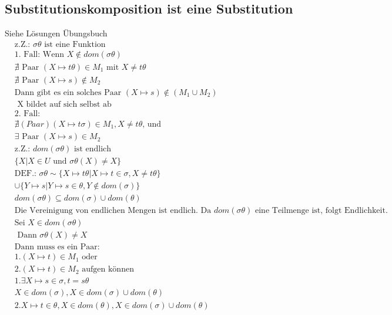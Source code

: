 \subsection{Substitutionskomposition ist eine Substitution}
Siehe Lösungen Übungsbuch
\begin{align*}
&\text{z.Z.: } \sigma\theta \text{ ist eine Funktion} \\
&\text{1. Fall: Wenn } X\notin dom(\sigma\theta) \\
&\nexists \text{ Paar } (X\mapsto t\theta ) \in M_1 \text{ mit } X \ne t\theta \\
&\nexists \text{ Paar } (X\mapsto s) \notin M_2 \\
&\text{Dann gibt es ein solches Paar } (X\mapsto s) \notin (M_1 \cup M_2)\\
&\text{ X bildet auf sich selbst ab } \\
&\text{2. Fall: } \\
&\nexists ( Paar ) (X\mapsto t\sigma)\in M_1 , X\ne t\theta \text{, und } \\
&\exists \text{ Paar } (X\mapsto s)\in M_2 \\
& \text{z.Z.: } dom(\sigma\theta) \text{ ist endlich } \\
& \{X|X\in U \text{ und } \sigma\theta (X) \ne X\} \\
& \text{DEF.: }\sigma\theta \sim \{X\mapsto t\theta | X \mapsto t\in \sigma, X \ne t\theta \} \\
& \cup \{ Y \mapsto s | Y \mapsto s \in \theta, Y \notin dom(\sigma) \} \\
& dom(\sigma\theta) \subseteq dom(\sigma ) \cup dom(\theta) \\
&\text{Die Vereinigung von endlichen Mengen ist endlich. Da } dom(\sigma\theta) \text{ eine Teilmenge ist, folgt Endlichkeit. } \\
&\text{Sei } X\in dom(\sigma\theta)\\
&\text{ Dann } \sigma\theta (X) \ne X \\
&\text{Dann muss es ein Paar: }\\
& 1. (X\mapsto t)\in M_{1} \text{ oder }\\
& 2. (X\mapsto t)\in M_{2} \text{ aufgen können}\\
& 1. \exists X\mapsto s \in \sigma , t = s\theta\\
& X \in dom(\sigma), X \in dom(\sigma)\cup dom(\theta) \\
& 2. X\mapsto t \in \theta, X \in dom(\theta), X\in dom(\sigma) \cup dom(\theta)
\end{align*}
